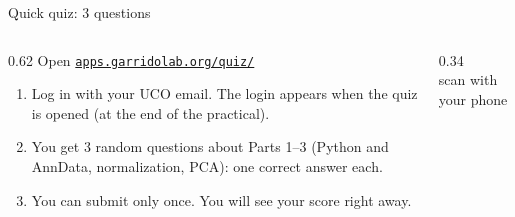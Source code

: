 \documentclass[aspectratio=169,10pt]{beamer}
\begin{document}
\begin{frame}{Quick quiz: 3 questions}
  \begin{columns}[T]
    \begin{column}{0.62\textwidth}
      \large Open \href{https://apps.garridolab.org/quiz/}{\alert{\texttt{apps.garridolab.org/quiz/}}}
      \normalsize\vspace{0.3cm}

      \begin{enumerate}\setlength\itemsep{6pt}
        \item Log in with your \alert{UCO email}. The login appears when the quiz is opened (at the end of the practical).
        \item You get \alert{3 random questions} about Parts 1--3 (Python and AnnData, normalization, PCA): one correct answer each.
        \item You can submit \alert{only once}. You will see your score right away.
      \end{enumerate}
    \end{column}
    \begin{column}{0.34\textwidth}
      \centering
      \\[4pt]
      \scriptsize scan with your phone
    \end{column}
  \end{columns}
\end{frame}
\end{document}
